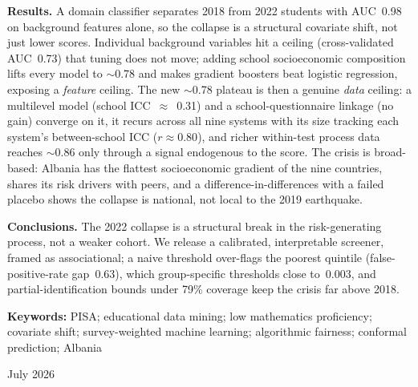 \documentclass[11pt,a4paper]{article}
\begin{document}
\begin{titlepage}
\begin{minipage}{0.86\linewidth}
\textbf{Results.}
A domain classifier separates 2018 from 2022 students with AUC~0.98 on background
features alone, so the collapse is a structural covariate shift, not just lower scores.
Individual background variables hit a ceiling (cross-validated AUC~0.73) that tuning does
not move; adding school socioeconomic composition lifts every model to $\sim$0.78 and
makes gradient boosters beat logistic regression, exposing a \emph{feature} ceiling. The
new $\sim$0.78 plateau is then a genuine \emph{data} ceiling: a multilevel model (school
ICC~$\approx$~0.31) and a school-questionnaire linkage (no gain) converge on it, it
recurs across all nine systems with its size tracking each system's between-school ICC
($r\approx0.80$), and richer within-test process data reaches $\sim$0.86 only through a
signal endogenous to the score. The crisis is broad-based: Albania has the flattest
socioeconomic gradient of the nine countries, shares its risk drivers with peers, and a
difference-in-differences with a failed placebo shows the collapse is national, not local
to the 2019 earthquake.

\textbf{Conclusions.}
The 2022 collapse is a structural break in the risk-generating process, not a weaker
cohort. We release a calibrated, interpretable screener, framed as associational; a naive
threshold over-flags the poorest quintile (false-positive-rate gap~0.63), which
group-specific thresholds close to~0.003, and partial-identification bounds under 79\%
coverage keep the crisis far above 2018.
\end{minipage}

\vspace{0.7cm}
\begin{minipage}{0.86\linewidth}
\small
\textbf{Keywords:} PISA; educational data mining; low mathematics proficiency; covariate
shift; survey-weighted machine learning; algorithmic fairness; conformal prediction;
Albania
\end{minipage}

\vspace{0.9cm}
{\large July 2026\par}
\end{titlepage}

\tableofcontents
\thispagestyle{fancy}
\listoffigures
\listoftables

\linenumbers








\end{document}
